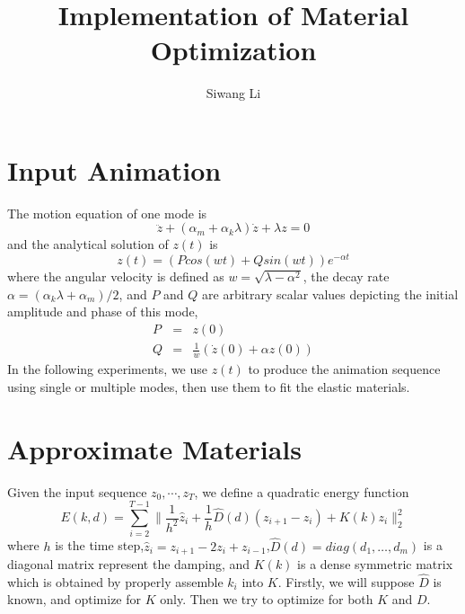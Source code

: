 \documentclass[twocolumn,a4paper]{article}
\author{Siwang Li}
\title{Implementation of Material Optimization}
\begin{document}
\maketitle

\section{Input Animation}
The motion equation of one mode is
\begin{equation} \label{deeq}
  \ddot{z} + (\alpha_m+\alpha_k\lambda)\dot{z} + \lambda z = 0
\end{equation}
and the analytical solution of $z(t)$ is
\begin{equation} \label{oss}
  z(t) = (Pcos(wt) + Qsin(wt))e^{-\alpha t}
\end{equation}
where the angular velocity is defined as $w = \sqrt{\lambda-\alpha^2}$, the
decay rate $\alpha = (\alpha_k\lambda+\alpha_m)/2$, and $P$ and $Q$ are
arbitrary scalar values depicting the initial amplitude and phase of this mode,
\begin{eqnarray}\label{PQ}
  P &=& z(0) \\
  Q &=& \frac{1}{w}(\dot{z}(0) + \alpha z(0))
\end{eqnarray}
In the following experiments, we use $z(t)$ to produce the animation sequence
using single or multiple modes, then use them to fit the elastic materials.

\section{Approximate Materials}
Given the input sequence $z_0,\cdots,z_T$, we define a quadratic energy function
\begin{equation} \label{qua-en}
  E(k,d) = \sum_{i=2}^{T-1} \|\frac{1}{h^2}\hat{z}_i+\frac{1}{h}\hat{D}(d)(z_{i+1}-z_{i})+ K(k)z_i\|_2^2
\end{equation}
where $h$ is the time step,$\hat{z}_i=z_{i+1}-2z_{i}+z_{i-1}$,$\hat{D}(d) =
diag(d_1,\dots,d_m)$ is a diagonal matrix represent the damping, and $K(k)$ is a
dense symmetric matrix which is obtained by properly assemble $k_i$ into
$K$. Firstly, we will suppose $\hat{D}$ is known, and optimize for $K$
only. Then we try to optimize for both $K$ and $D$.
\end{document}
